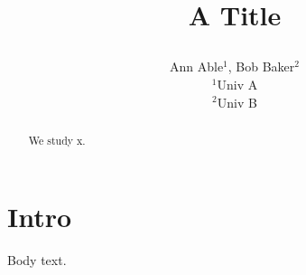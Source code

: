 \documentclass{article}
\begin{document}
\title{A Title\\
\author{Ann Able$^1$, Bob Baker$^2$\\ $^1$Univ A\\ $^2$Univ B}}
\maketitle
\begin{abstract}
We study x.
\end{abstract}
\section{Intro}
Body text.
\end{document}
